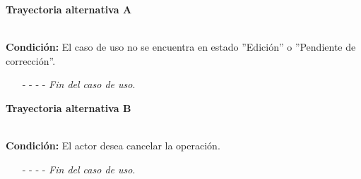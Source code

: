 \hypertarget{CU12-1-6-3:TAA}{\textbf{Trayectoria alternativa A}}\\
\noindent \textbf{Condición:} El caso de uso no se encuentra en estado ''Edición'' o ''Pendiente de corrección''.
\begin{enumerate}
	\UCpaso[\UCsist]  Oculta el botón  del caso que no se encuentra en estado de ''Edición'' o ''Pendiente de corrección''.
	\item[- -] - - {\em {Fin del caso de uso}}.
\end{enumerate}
	\hypertarget{CU12-1-6-3:TAB}{\textbf{Trayectoria alternativa B}}\\
	\noindent \textbf{Condición:} El actor desea cancelar la operación.
	\begin{enumerate}
		\UCpaso[\UCactor] Oprime el botón  de la pantalla emergente.
		\UCpaso[\UCsist] Muestra la pantalla .
		\item[- -] - - {\em {Fin del caso de uso}}.%
	\end{enumerate}


